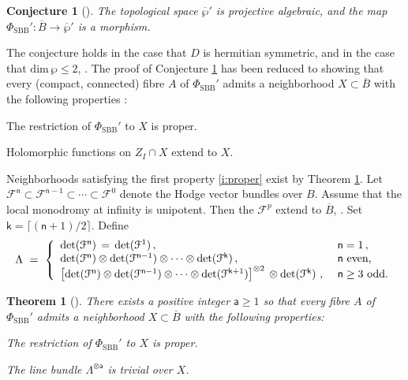 \documentclass[12pt]{amsart}
\numberwithin{equation}{section}
\numberwithin{table}{section}
\def\sfa{\mathsf{a}}
\def\tdet{\mathrm{det}}
\def\tdim{\mathrm{dim}}
\def\cF{\mathcal{F}}
\def\sfk{\mathsf{k}}
\def\sfn{\mathsf{n}}
\def\ot{\otimes}
\newtheorem{theorem}[equation]{Theorem}
\newtheorem{conjecture}[equation]{Conjecture}
\theoremstyle{definition}
\newcounter{proj} %
\theoremstyle{definition}
\theoremstyle{remark}
\newenvironment{I_list}
  {\begin{enumerate}[label=(\Roman*),itemsep=3pt,leftmargin=25pt,listparindent=20pt]}
  {\end{enumerate}}
\newenvironment{i_list_emph}
  {\begin{enumerate}[label=\emph{(\roman*)},itemsep=3pt,leftmargin=25pt,listparindent=20pt]}
  {\end{enumerate}}
\def\olB{\overline B}
\def\hPhiS{\Phi_\mathrm{SBB}'}
\def\hatP{\overline{\wp}{}'}
\begin{document}
\begin{conjecture}[{\cite{GGR-part1}}] \label{conj:ggr}
The topological space $\hatP$ is projective algebraic, and the map $\hPhiS : \olB \to \hatP$ is a morphism.  
\end{conjecture}

\noindent The conjecture holds in the case that $D$ is hermitian symmetric, and in the case that $\tdim\,\wp \le 2$, \cite{GGLR}.  The proof of Conjecture \ref{conj:ggr} has been reduced to showing that every (compact, connected) fibre $A$ of $\hPhiS$ admits a neighborhood $X \subset \olB$ with the following properties \cite[\S8]{GGR-part1}:
\begin{I_list}
\item \label{i:proper}
The restriction of $\hPhiS$ to $X$ is proper.
\item \label{i:extn}
Holomorphic functions on $Z_I \cap X$ extend to $X$.
\end{I_list}

\noindent Neighborhoods satisfying the first property \ref{i:proper} exist by Theorem \ref{T:ggr}.  Let $\cF^{\sfn} \subset \cF^{\sfn-1} \subset \cdots \subset \cF^0$ denote the Hodge vector bundles over $B$.  Assume that the local monodromy at infinity is unipotent.  Then the $\cF^p$ extend to $\olB$, \cite{MR1416353}.  Set $\sfk = \lceil (\sfn+1)/2 \rceil$.  Define
\begin{equation}\label{E:Lambda}
  \Lambda \ = \ \left\{
    \begin{array}{ll}
    \tdet(\cF^\sfn) \,=\, \tdet(\cF^1) \,,\quad & \sfn=1 \,,\\
    \tdet(\cF^\sfn) \ot \tdet(\cF^{\sfn-1}) \ot \cdots \ot 
    	\tdet(\cF^\sfk) \,,\quad & 
    \sfn  \hbox{ even,} \\
    \left[\tdet(\cF^\sfn) \ot \tdet(\cF^{\sfn-1}) 
    \ot \cdots \ot \tdet(\cF^{\sfk+1}) \right]^{\ot2} \, 
    	\ot \tdet(\cF^\sfk)\, \,, \  &
    \sfn \ge 3 \hbox{ odd.}
    \end{array}
  \right.
\end{equation}

\begin{theorem}[{\cite{GGR-part1}}] \label{T:ggr}
There exists a positive integer $\sfa \ge 1$ so that every fibre $A$ of $\hPhiS$ admits a neighborhood $X \subset \olB$ with the following properties: 
\begin{i_list_emph}
\item 
The restriction of $\hPhiS$ to $X$ is proper.
\item 
The line bundle $\Lambda^{\ot \sfa}$ is trivial over $X$.
\end{i_list_emph}
\end{theorem}
\end{document}
